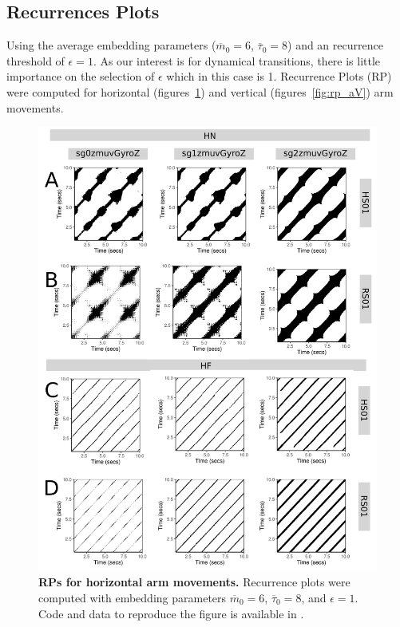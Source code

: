 \documentclass[fleqn,10pt]{wlscirep}
\begin{document}
\subsection*{Recurrences Plots}
Using the average embedding parameters 
($\overline{m}_0=6$, $\overline{\tau}_0=8$) 
and an recurrence threshold of $\epsilon=1$.
As our interest is for dynamical transitions, 
there is little importance on the selection of $\epsilon$ which in this case
is 1. 
Recurrence Plots (RP) were computed for horizontal (figures~\ref{fig:rp_aH}) and 
vertical (figures~\ref{fig:rp_aV}) arm movements.
\begin{figure}[ht]
\centering
\includegraphics[width=1.0\textwidth]{rp_aH}
\caption{
	{\bf RPs for horizontal arm movements.}	
	Recurrence plots were computed with 
	embedding parameters 
	$\overline{m}_0=6$, $\overline{\tau}_0=8$, and $\epsilon=1$.
	Code and data to reproduce the figure is available in \cite{srep2020}.
        }
    \label{fig:rp_aH}
\end{figure}
\end{document}
